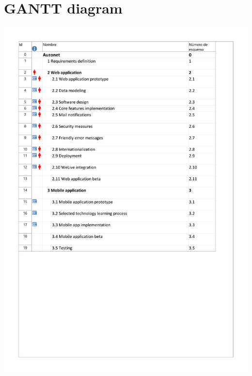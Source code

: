 \documentclass{DeustoFDP}
\begin{document}
\newpage
\section{GANTT diagram}
\begin{center}
	\includegraphics[width=1\linewidth]{fig/g1}
\end{center}
\end{document}
